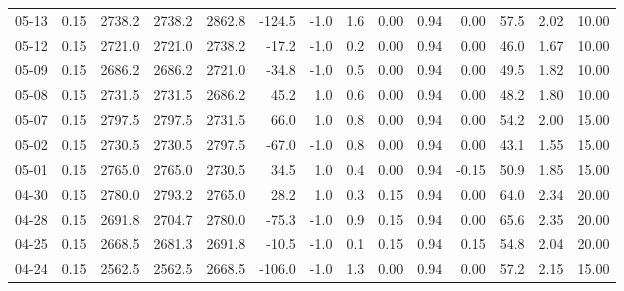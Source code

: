 \begin{threeparttable}
{\begin{tabular}{lrrrrrrrrrrrrr}
  05-13 &     0.15 & 2738.2 & 2738.2 & 2862.8 &     -124.5 &                     -1.0 &                 1.6 &       0.00 &      0.94 &           0.00 &             57.5 &            2.02 &                  10.00 \\
  05-12 &     0.15 & 2721.0 & 2721.0 & 2738.2 &      -17.2 &                     -1.0 &                 0.2 &       0.00 &      0.94 &           0.00 &             46.0 &            1.67 &                  10.00 \\
  05-09 &     0.15 & 2686.2 & 2686.2 & 2721.0 &      -34.8 &                     -1.0 &                 0.5 &       0.00 &      0.94 &           0.00 &             49.5 &            1.82 &                  10.00 \\
  05-08 &     0.15 & 2731.5 & 2731.5 & 2686.2 &       45.2 &                      1.0 &                 0.6 &       0.00 &      0.94 &           0.00 &             48.2 &            1.80 &                  10.00 \\
  05-07 &     0.15 & 2797.5 & 2797.5 & 2731.5 &       66.0 &                      1.0 &                 0.8 &       0.00 &      0.94 &           0.00 &             54.2 &            2.00 &                  15.00 \\
  05-02 &     0.15 & 2730.5 & 2730.5 & 2797.5 &      -67.0 &                     -1.0 &                 0.8 &       0.00 &      0.94 &           0.00 &             43.1 &            1.55 &                  15.00 \\
  05-01 &     0.15 & 2765.0 & 2765.0 & 2730.5 &       34.5 &                      1.0 &                 0.4 &       0.00 &      0.94 &          -0.15 &             50.9 &            1.85 &                  15.00 \\
  04-30 &     0.15 & 2780.0 & 2793.2 & 2765.0 &       28.2 &                      1.0 &                 0.3 &       0.15 &      0.94 &           0.00 &             64.0 &            2.34 &                  20.00 \\
  04-28 &     0.15 & 2691.8 & 2704.7 & 2780.0 &      -75.3 &                     -1.0 &                 0.9 &       0.15 &      0.94 &           0.00 &             65.6 &            2.35 &                  20.00 \\
  04-25 &     0.15 & 2668.5 & 2681.3 & 2691.8 &      -10.5 &                     -1.0 &                 0.1 &       0.15 &      0.94 &           0.15 &             54.8 &            2.04 &                  20.00 \\
  04-24 &     0.15 & 2562.5 & 2562.5 & 2668.5 &     -106.0 &                     -1.0 &                 1.3 &       0.00 &      0.94 &           0.00 &             57.2 &            2.15 &                  15.00 \\

\end{tabular}}
\end{threeparttable}
